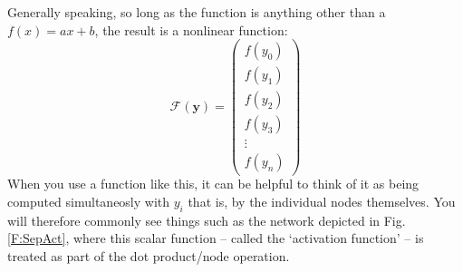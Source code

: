 \documentclass[a4paper,openany,11pt]{book}
\renewcommand\vec[1]{\boldsymbol{\mathbf{#1}}}
\begin{document}
					Generally speaking, so long as the function is anything other than a $f(x) = a x +b$, the result is a nonlinear function:
					\begin{equation}
						\mathcal{F}(\vec{y}) = \begin{pmatrix}
							f(y_0) \\ f(y_1) \\ f(y_2) \\ f(y_3) \\ \vdots \\ f(y_n)
						\end{pmatrix}
					\end{equation}
					When you use a function like this, it can be helpful to think of it as being computed simultaneosly with $y_i$ that is, by the individual nodes themselves. You will therefore commonly see things such as the network depicted in Fig. \ref{F:SepAct}, where this scalar function -- called the `activation function' -- is treated as part of the dot product/node operation.
\end{document}
